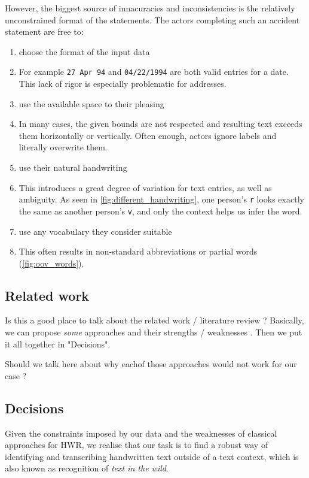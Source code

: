However, the biggest source of innacuracies and inconsistencies is the relatively unconstrained format of the statements. The actors completing such an accident statement are free to:
\begin{enumerate}
	\item choose the format of the input data
	\item[] For example \texttt{27 Apr 94} and \texttt{04/22/1994} are both valid entries for a date. This lack of rigor is especially problematic for addresses.

	\item use the available space to their pleasing
	\item[] In many cases, the given bounds are not respected and resulting text exceeds them horizontally or vertically. Often enough, actors ignore labels and literally overwrite them.

	\item{use their natural handwriting \label{itm:natural_handwriting}}
	\item[] This introduces a great degree of variation for text entries, as well as ambiguity. As seen in \cref{fig:different_handwriting}, one person's \texttt{r} looks exactly the same as another person's \texttt{v}, and only the context helps us infer the word.

	\item use any vocabulary they consider suitable
	\item[] This often results in non-standard abbreviations or partial words (\cref{fig:oov_words}).
\end{enumerate}

\subsection{Related work}
Is this a good place to talk about the related work / literature review ? Basically, we can propose \emph{some} approaches and their strengths / weaknesses . Then we put it all together in "Decisions".

Should we talk here about why eachof those approaches would not work for our case ?

\subsection{Decisions}
Given the constraints imposed by our data and the weaknesses of classical approaches for HWR, we realise that our task is to find a robust way of identifying and transcribing handwritten text outside of a text context, which is also known as recognition of \emph{text in the wild}.



